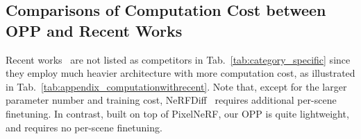 \subsection{Comparisons of Computation Cost between OPP and Recent Works}

Recent works~\cite{lin2023visionnerf,gu2023nerfdiff} are not listed as competitors in Tab.~\ref{tab:category_specific} since they employ much heavier architecture with more computation cost, as illustrated in Tab.~\ref{tab:appendix_computationwithrecent}. Note that, except for the larger parameter number and training cost, NeRFDiff~\cite{gu2023nerfdiff} requires additional per-scene finetuning. In contrast, built on top of PixelNeRF, our OPP is quite lightweight, and requires no per-scene finetuning.


% 


% 
% 
% 



% 
% 
% 

% 
% 
% 


